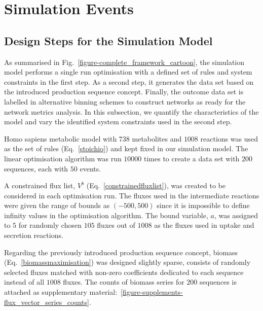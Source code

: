 \section{Simulation Events}
\subsection{Design Steps for the Simulation Model}

As summarised in Fig.~\ref{figure-complete_framework_cartoon}, the simulation model performs a single run optimisation with a defined set of rules and system constraints in the first step. As a second step, it generates the data set based on the introduced production sequence concept. Finally, the outcome data set is labelled in alternative binning schemes to construct networks as ready for the network metrics analysis. In this subsection, we quantify the characteristics of the model and vary the identified system constraints used in the second step.

Homo sapiens metabolic model with $738$ metabolites and $1008$ reactions was used as the set of rules (Eq.~\ref{stoichio}) and kept fixed in our simulation model. The linear optimisation algorithm was run $10000$ times to create a data set with $200$ sequences, each with $50$ events.

A constrained flux list, $V^{b}$ (Eq.~\ref{constrainedfluxlist}), was created to be considered in each optimisation run. The fluxes used in the intermediate reactions were given the range of bounds as $(-500, 500)$ since it is impossible to define infinity values in the optimisation algorithm. The bound variable, $a$, was assigned to $5$ for randomly chosen $105$ fluxes out of $1008$ as the fluxes used in uptake and secretion reactions.

Regarding the previously introduced production sequence concept, biomass (Eq.~\ref{biomassmaximisation}) was designed slightly sparse, consists of randomly selected fluxes matched with non-zero coefficients dedicated to each sequence instead of all $1008$ fluxes. The counts of biomass series for $200$ sequences is attached as supplementary material:~\ref{figure-supplements-flux_vector_series_counts}.

